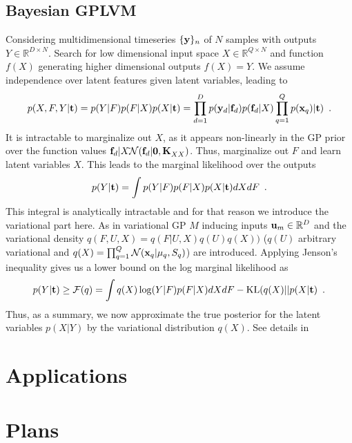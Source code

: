 \documentclass[11pt, a4paper]{article}
\begin{document}
\subsection{Bayesian GPLVM }
\label{sec:vargplvm}
Considering multidimensional timeseries $\{{\bf y}\}_n$ of $N$ samples with outputs $Y\in\mathbb R^{D\times N}$. Search for low dimensional input space $X\in\mathbb R^{Q\times N}$ and function $f(X)$ generating higher dimensional outputs $f(X) = Y$. We assume independence over latent features given latent variables, leading to
\begin{equation}
  \label{eq:vargplvmmodel}
  p(X,F,Y|{\bf t})=p(Y|F)p(F|X)p(X|{\bf t})=\prod_{d=1}^Dp({\bf y}_d|{\bf f}_d)p({\bf f}_d|X)\prod_{q=1}^Qp({\bf x}_q)|{\bf t})\enspace.
\end{equation}
It is intractable to marginalize out $X$, as it appears non-linearly in the GP prior over the function values ${\bf f}_d|X\tilde{}\mathcal{N}({\bf f}_d|{\bf 0,K}_{XX})$. Thus, marginalize out $F$ and learn latent variables $X$. This leads to the marginal likelihood over the outputs
\begin{equation}
  \label{eq:lmlvargplvm}
  p(Y|{\bf t}) = \int p(Y|F)p(F|X)p(X|{\bf t}) dXdF\enspace.
\end{equation}
This integral is analytically intractable and for that reason we introduce the variational part here. As in variational GP $M$ inducing inputs ${\bf u}_m\in\mathbb R^{D}$ and the variational density $q(F,U,X)=q(F|U,X)q(U)q(X))$ ($q(U)$ arbitrary variational and $q(X)=\prod_{q=1}^Q\mathcal N({\bf x}_q|{\bf \mu}_q,S_q)$) are introduced. Applying Jenson's inequality gives us a lower bound on the log marginal likelihood as
\begin{equation}
  \label{eq:lowerboundlml}
  p(Y|{\bf t})\geq \mathcal F(q) = \int q(X)\log (Y|F)p(F|X) dXdF - \text{KL}(q(X) || p(X|{\bf t})\enspace.
\end{equation}
Thus, as a summary, we now approximate the true posterior for the latent variables $p(X|Y)$ by the variational distribution $q(X)$. See details in 
\section{Applications}
\label{sec:applications}


\section{Plans}
\label{sec:plans}





\end{document}
